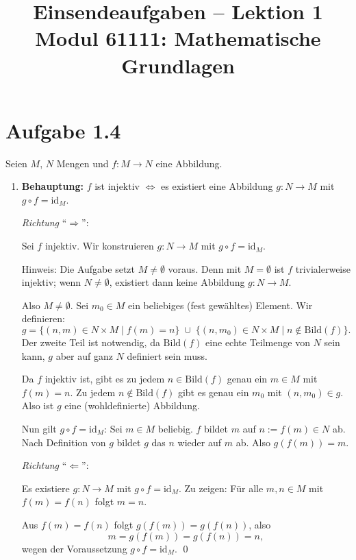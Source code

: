 \documentclass[a4paper,12pt]{article}
\title{Einsendeaufgaben -- Lektion 1\\[0.5em]
\large Modul 61111: Mathematische Grundlagen}
\author{}
\date{}
\begin{document}
\maketitle

\section*{Aufgabe 1.4}

Seien $M$, $N$ Mengen und $f: M \to N$ eine Abbildung.

\begin{enumerate}[label=\alph*)]

\item \textbf{Behauptung:} $f$ ist injektiv $\Longleftrightarrow$ es existiert eine Abbildung $g: N \to M$ mit $g \circ f = \mathrm{id}_M$.

\medskip
\textit{Richtung} ``$\Rightarrow$'':

Sei $f$ injektiv. Wir konstruieren $g: N \to M$ mit $g \circ f = \mathrm{id}_M$.

Hinweis: Die Aufgabe setzt $M \neq \emptyset$ voraus. Denn mit $M = \emptyset$ ist $f$ trivialerweise injektiv; wenn $N \neq \emptyset$, existiert dann keine Abbildung $g: N \to M$.

Also $M \neq \emptyset$. Sei $m_0 \in M$ ein beliebiges (fest gewähltes) Element. Wir definieren:
\[
  g = \{(n, m) \in N \times M \mid f(m) = n\}
      \;\cup\;
      \{(n, m_0) \in N \times M \mid n \notin \mathrm{Bild}(f)\}.
\]
Der zweite Teil ist notwendig, da $\mathrm{Bild}(f)$ eine echte Teilmenge von $N$ sein kann, $g$ aber auf ganz $N$ definiert sein muss.

Da $f$ injektiv ist, gibt es zu jedem $n \in \mathrm{Bild}(f)$ genau ein $m \in M$ mit $f(m) = n$. Zu jedem $n \notin \mathrm{Bild}(f)$ gibt es genau ein $m_0$ mit $(n, m_0) \in g$. Also ist $g$ eine (wohldefinierte) Abbildung.

Nun gilt $g \circ f = \mathrm{id}_M$: Sei $m \in M$ beliebig. $f$ bildet $m$ auf $n := f(m) \in N$ ab. Nach Definition von $g$ bildet $g$ das $n$ wieder auf $m$ ab. Also $g(f(m)) = m$.

\medskip
\textit{Richtung} ``$\Leftarrow$'':

Es existiere $g: N \to M$ mit $g \circ f = \mathrm{id}_M$.
Zu zeigen: Für alle $m, n \in M$ mit $f(m) = f(n)$ folgt $m = n$.

Aus $f(m) = f(n)$ folgt $g(f(m)) = g(f(n))$, also
\[
  m = g(f(m)) = g(f(n)) = n,
\]
wegen der Voraussetzung $g \circ f = \mathrm{id}_M$. \qed


\end{enumerate}
\end{document}
